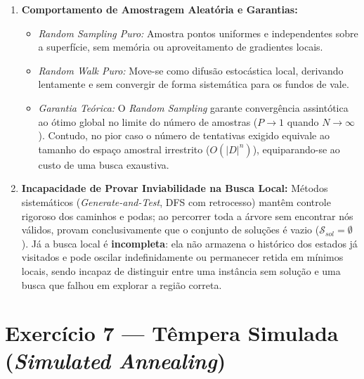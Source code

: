 \begin{enumerate}[label=(\alph*)]
    \item \textbf{Comportamento de Amostragem Aleatória e Garantias:}
    \begin{itemize}
        \item \textit{Random Sampling Puro:} Amostra pontos uniformes e independentes sobre a superfície, sem memória ou aproveitamento de gradientes locais.
        \item \textit{Random Walk Puro:} Move-se como difusão estocástica local, derivando lentamente e sem convergir de forma sistemática para os fundos de vale.
        \item \textit{Garantia Teórica:} O \textit{Random Sampling} garante convergência assintótica ao ótimo global no limite do número de amostras ($P \to 1$ quando $N \to \infty$). Contudo, no pior caso o número de tentativas exigido equivale ao tamanho do espaço amostral irrestrito ($O(|D|^n)$), equiparando-se ao custo de uma busca exaustiva.
    \end{itemize}

    \item \textbf{Incapacidade de Provar Inviabilidade na Busca Local:}
    Métodos sistemáticos (\textit{Generate-and-Test}, DFS com retrocesso) mantêm controle rigoroso dos caminhos e podas; ao percorrer toda a árvore sem encontrar nós válidos, provam conclusivamente que o conjunto de soluções é vazio ($\mathcal{S}_{sol} = \emptyset$). Já a busca local é \textbf{incompleta}: ela não armazena o histórico dos estados já visitados e pode oscilar indefinidamente ou permanecer retida em mínimos locais, sendo incapaz de distinguir entre uma instância sem solução e uma busca que falhou em explorar a região correta.
\end{enumerate}

\section{Exercício 7 — Têmpera Simulada (\textit{Simulated Annealing})}

